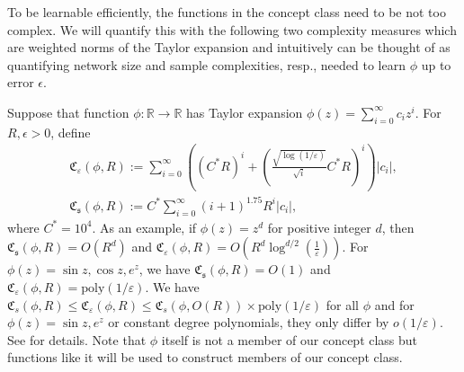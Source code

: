 To be learnable efficiently, the functions in the concept class need to be not too complex. We will quantify this with the following two complexity measures which are weighted norms of the Taylor expansion and intuitively can be thought of as quantifying network size and sample complexities, resp., needed to learn $\phi$ up to error $\epsilon$. 

\begin{definition}\label{def:complexity}
	Suppose that function $\phi: \mathbb{R} \rightarrow \mathbb{R}$ has Taylor expansion $\phi(z)=\sum_{i=0}^{\infty} c_{i} z^{i}$. For $R, \epsilon>0$, define
	$$
	\begin{array}{l}
		\mathfrak{C}_{\varepsilon}(\phi, R) := \sum_{i=0}^{\infty}\left(\left(C^{*} R\right)^{i}+\left(\frac{\sqrt{\log (1 / \varepsilon)}}{\sqrt{i}} C^{*} R\right)^{i}\right)\left|c_{i}\right|, \\
		\mathfrak{C}_{\mathfrak{s}}(\phi, R) := C^{*} \sum_{i=0}^{\infty}(i+1)^{1.75} R^{i}\left|c_{i}\right|,
	\end{array}
	$$ 
	where $C^{*}=10^{4}$. As an example, if $\phi(z) = z^d$ for positive integer $d$, then $\mathfrak{C}_{\mathfrak{s}}(\phi, R) = O(R^d)$ and 
	$\mathfrak{C}_{\varepsilon}(\phi, R)  = O(R^d \log^{d/2}(\frac{1}{\varepsilon}))$. For $\phi(z) = \sin z, \cos z, e^{z}$, we have     
	$\mathfrak{C}_{\mathfrak{s}}(\phi, R) = O(1)$ and $\mathfrak{C}_{\varepsilon}(\phi, R) = \mathrm{poly}(1/\varepsilon)$. 
	We have $\mathfrak{C}_{{s}}(\phi, R) \leq \mathfrak{C}_{\varepsilon}(\phi, R) \leq \mathfrak{C}_{{s}}(\phi, O(R)) \times \mathrm{poly}(1 / \varepsilon)$ for all $\phi$ and for $\phi(z) = \sin z, e^{z}$ or constant degree polynomials, they only differ by $o(1 / \varepsilon)$. 
	See \cite{allen2019learning} for details.
	Note that $\phi$ itself is not a member of our concept class but functions like it will be used to construct members of our concept class. 
\end{definition}



